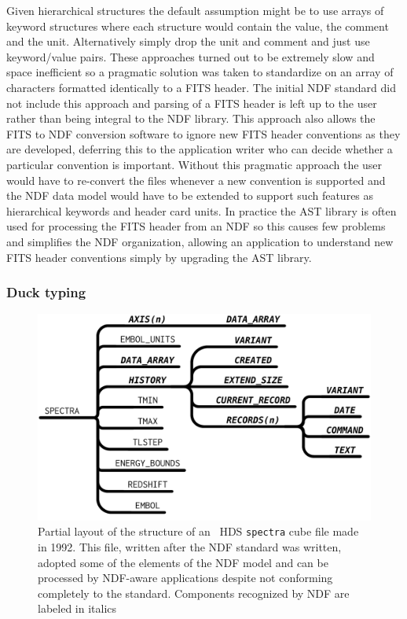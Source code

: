 \documentclass[final,authoryear,5p,times,twocolumn]{elsarticle}
\begin{document}
Given hierarchical structures the default assumption might be to use
arrays of keyword structures where each structure would contain the
value, the comment and the unit. Alternatively simply drop the unit
and comment and just use keyword/value pairs. These approaches turned
out to be extremely slow and space inefficient so a pragmatic solution
was taken to standardize on an array of characters formatted
identically to a FITS header. The initial NDF standard did not include
this approach and parsing of a FITS header is left up to the user
rather than being integral to the NDF library. This approach also allows the FITS to NDF conversion
software to ignore new FITS header conventions as they are developed,
deferring this to the application writer who can decide whether a
particular convention is important. Without this pragmatic approach
the user would have to re-convert the files whenever a new convention
is supported and the NDF data model would have to be extended to
support such features as hierarchical keywords and header card units.
In practice the AST
library \citep{1998ASPC..145...41W} is often used for processing the FITS
header from an NDF so this causes few problems and simplifies the NDF
organization, allowing an application to understand new FITS header
conventions simply by upgrading the AST library.

\subsubsection{Duck typing}

\begin{figure}[t]
\begin{center}
\includegraphics[width=\columnwidth]{model-asterix2}
\end{center}
\caption{Partial layout of the structure of an \asterix\ HDS
  \texttt{spectra} cube file made in 1992. This file, written after the NDF
  standard was written, adopted some of the elements of the
  NDF model and can be processed by NDF-aware applications despite not
  conforming completely to the standard. Components recognized by NDF
  are labeled in italics}
\label{fig:duck}
\end{figure}
\end{document}
